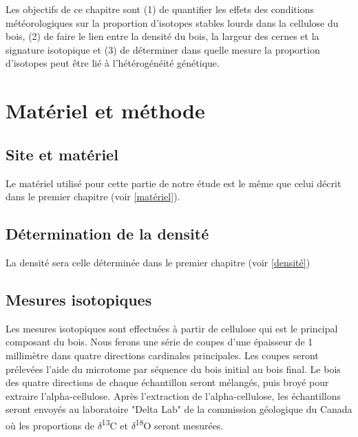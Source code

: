 \documentclass[a4paper,12pt]{report}
\newcommand{\Ctreize}{$\delta$\textsuperscript{13}C\xspace}
\newcommand{\Odixhuit}{$\delta$\textsuperscript{18}O\xspace}
\begin{document}
Les objectifs de ce chapitre sont (1) de quantifier les effets des conditions météorologiques sur la proportion d'isotopes stables lourds dans la cellulose du bois, (2) de faire le lien entre la densité du bois, la largeur des cernes et la signature isotopique et (3) de déterminer dans quelle mesure la proportion d'isotopes peut être lié à l'hétérogénéité génétique. %

\section{Matériel et méthode}

\subsection*{Site et matériel}
Le matériel utilisé pour cette partie de notre étude est le même que celui décrit dans le premier chapitre (voir \ref{matériel}).  


\subsection*{Détermination de la densité}
La densité sera celle déterminée dans le premier chapitre (voir \ref{densité})

\subsection*{Mesures isotopiques}
Les mesures isotopiques sont effectuées à partir de cellulose qui est le principal composant du bois. Nous ferons une série de coupes d'une épaisseur de 1 millimètre dans quatre directions cardinales principales. Les coupes seront prélevées l'aide du microtome par séquence du bois initial au bois final. Le bois des quatre directions de chaque échantillon seront mélangés, puis broyé pour extraire l'alpha-cellulose. Après l'extraction de l'alpha-cellulose, les échantillons seront envoyés au laboratoire "Delta Lab" de la commission géologique du Canada où les proportions de \Ctreize et \Odixhuit seront mesurées.
\end{document}
